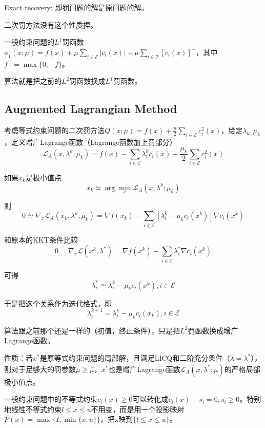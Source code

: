 Exact recovery: 即罚问题的解是原问题的解。

二次罚方法没有这个性质捏。

一般约束问题的$L^1$罚函数$\phi_{1}(x ; \mu)=f(x)+\mu \sum_{i \in \mathcal{E}}\left|c_{i}(x)\right|+\mu \sum_{i \in \mathcal{I}}\left[c_{i}(x)\right]^{-}$，其中$f^- = \max\{0, -f\}$。

算法就是把之前的$L^2$罚函数换成$L^1$罚函数。

\subsection{Augmented Lagrangian Method}

考虑等式约束问题的二次罚方法$Q(x; \mu) = f(x)+\frac{\mu}{2} \sum_{i \in \mathcal{E}} c_{i}^{2}(x)$，给定$\lambda_{k}, \mu_{k}$，定义增广Lagrange函数（Lagrange函数加上罚部分）
\[
  \mathcal{L}_{A}\left(x, \lambda^{k}; \mu_{k}\right)=f(x)-\sum_{i \in \mathcal{E}} \lambda^k_{i} c_{i}(x)+\frac{\mu_k}{2} \sum_{i \in \mathcal{E}} c_{i}^{2}(x)
\]

如果$x_k$是极小值点
\[
  x_k \simeq \arg \min _{x} \mathcal{L}_{A}\left(x, \lambda^{k}; \mu_{k}\right)
\]

则
\[
  0 \simeq \nabla_{x} \mathcal{L}_{A}\left(x_k, \lambda^k; \mu_{k}\right)=\nabla f\left(x_k\right)-\sum_{i \in \mathcal{E}}\left[\lambda^k_i-\mu_{k} c_{i}\left(x^{k}\right)\right] \nabla c_{i}\left(x^{k}\right)
\]

和原本的KKT条件比较
\[
  0=\nabla_{x} \mathcal{L}\left(x^{k}, \lambda^{*}\right)=\nabla f\left(x^{k}\right)-\sum_{i \in \mathcal{E}} \lambda^{*}_i \nabla c_{i}\left(x^{k}\right)
\]

可得
\[
  \lambda_{i}^{*} \simeq \lambda_{i}^{k}-\mu_{k} c_{i}\left(x^{k}\right), i \in \mathcal{E}
\]

于是把这个关系作为迭代格式，即
\[
  \lambda_{i}^{k+1}=\lambda_{i}^{k}-\mu_{k} c_{i}\left(x_{k}\right), i \in \mathcal{E}
\]

算法跟之前那个还是一样的（初值，终止条件），只是把$L^2$罚函数换成增广Lagrange函数。

性质：若$x^{\ast}$是原等式约束问题的局部解，且满足LICQ和二阶充分条件（$\lambda = \lambda^{\ast}$），则对于足够大的罚参数$\mu \ge \bar{\mu}$，$x^{\ast}$也是增广Lagrange函数$\mathcal{L}_{A}\left(x, \lambda^{\ast}; \mu\right)$的严格局部极小值点。

一般约束问题中的不等式约束$c_i(x) \ge 0$可以转化成$c_i(x) - s_i = 0, s_i \ge 0$。特别地线性不等式约束$l \le x \le u$不用变，而是用一个投影映射$P(x)=\max \{I, \min \{x, u\}\}$，把x映到$\{l \le x \le u\}$。

